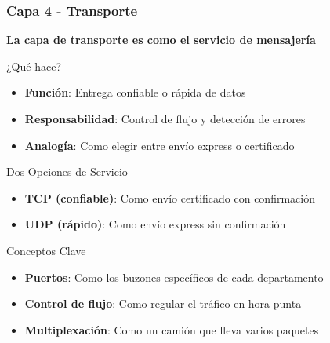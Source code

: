 \documentclass[aspectratio=169]{beamer}
\begin{document}
            \begin{frame}
            \frametitle{Capa 4 - Transporte}
            
            \begin{center}
            \Large \textbf{La capa de transporte es como el servicio de mensajería}
            \end{center}
            
        
            \begin{block}{¿Qué hace?}
            \begin{itemize}
            \item \textbf{Función}: Entrega confiable o rápida de datos
            \item \textbf{Responsabilidad}: Control de flujo y detección de errores
            \item \textbf{Analogía}: Como elegir entre envío express o certificado
            \end{itemize}
            \end{block}
            
            \begin{block}{Dos Opciones de Servicio}
            \begin{itemize}
            \item \textbf{TCP (confiable)}: Como envío certificado con confirmación
            \item \textbf{UDP (rápido)}: Como envío express sin confirmación
            \end{itemize}
            \end{block}
            
            \begin{block}{Conceptos Clave}
            \begin{itemize}
            \item \textbf{Puertos}: Como los buzones específicos de cada departamento
            \item \textbf{Control de flujo}: Como regular el tráfico en hora punta
            \item \textbf{Multiplexación}: Como un camión que lleva varios paquetes
            \end{itemize}
            \end{block}
            
       
            
            \end{frame}
            
\end{document}
